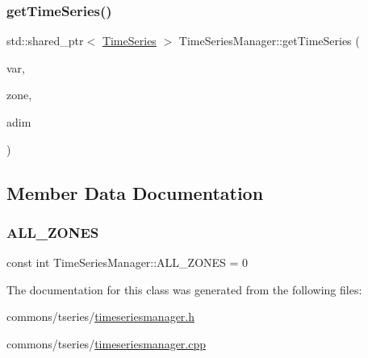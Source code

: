\mbox{\label{classdisplace_1_1simulation_1_1_time_series_manager_ac636e5a7e758a29208ce0c75462199e4}} 
\subsubsection{\texorpdfstring{getTimeSeries()}{getTimeSeries()}}
{\footnotesize\ttfamily std\+::shared\+\_\+ptr$<$ \mbox{\hyperlink{classdisplace_1_1simulation_1_1_time_series}{Time\+Series}} $>$ Time\+Series\+Manager\+::get\+Time\+Series (\begin{DoxyParamCaption}\item[{\mbox{\hyperlink{classdisplace_1_1simulation_1_1_time_series_manager_ae4e516e8c6ce2707d48ffafec4613ece}{Time\+Series\+Manager\+::\+Variables}}}]{var,  }\item[{int}]{zone,  }\item[{int}]{adim }\end{DoxyParamCaption})}



\subsection{Member Data Documentation}
\mbox{\label{classdisplace_1_1simulation_1_1_time_series_manager_a06666b8659fd2756aa5fadecaa4f8354}} 
\subsubsection{\texorpdfstring{ALL\_ZONES}{ALL\_ZONES}}
{\footnotesize\ttfamily const int Time\+Series\+Manager\+::\+A\+L\+L\+\_\+\+Z\+O\+N\+ES = 0\hspace{0.3cm}{\ttfamily [static]}}



The documentation for this class was generated from the following files\+:\begin{DoxyCompactItemize}
\item 
commons/tseries/\mbox{\hyperlink{timeseriesmanager_8h}{timeseriesmanager.\+h}}\item 
commons/tseries/\mbox{\hyperlink{timeseriesmanager_8cpp}{timeseriesmanager.\+cpp}}\end{DoxyCompactItemize}
